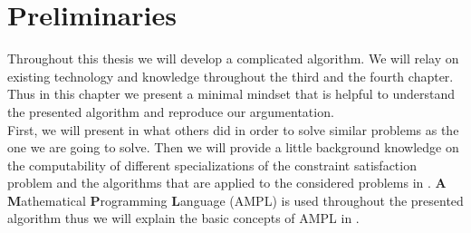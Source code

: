 \chapter{Preliminaries}
\label{chap:preliminaries}
Throughout this thesis we will develop a complicated algorithm. We will relay on existing technology and knowledge throughout the third and the fourth chapter. Thus in this chapter we present a minimal mindset that is helpful to understand the presented algorithm and reproduce our argumentation. \\
First, we will present in  what others did in order to solve similar problems as the one we are going to solve.
Then we will provide a little background knowledge on the computability of different specializations of the constraint satisfaction problem and the algorithms that are applied to the considered problems in . 
\textbf{A} \textbf{M}athematical \textbf{P}rogramming \textbf{L}anguage (AMPL) is used throughout the presented algorithm thus we will explain the basic concepts of AMPL in . 
